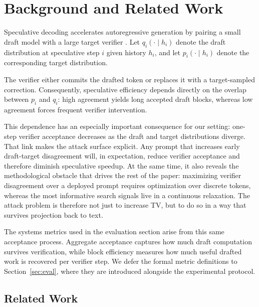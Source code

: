 \section{Background and Related Work}
\label{sec:background}

Speculative decoding accelerates autoregressive generation by pairing a small
draft model with a large target verifier \citep{leviathan2023speculative}. Let
$q_i(\cdot \mid h_i)$ denote the draft distribution at speculative step $i$
given history $h_i$, and let $p_i(\cdot \mid h_i)$ denote the corresponding
target distribution.

The verifier either commits the drafted token or replaces it with a
target-sampled correction. Consequently, speculative efficiency depends
directly on the overlap between $p_i$ and $q_i$: high agreement yields long
accepted draft blocks, whereas low agreement forces frequent verifier
intervention.

This dependence has an especially important consequence for our setting:
one-step verifier acceptance decreases as the draft and target distributions
diverge. That link makes the attack surface explicit. Any prompt that
increases early draft-target disagreement will, in expectation, reduce
verifier acceptance and therefore diminish speculative speedup. At the same
time, it also reveals the methodological obstacle that
drives the rest of the paper: maximizing verifier disagreement over a deployed
prompt requires optimization over discrete tokens, whereas the most informative
search signals live in a continuous relaxation. The attack problem is
therefore not just to increase TV, but to do so in a way that survives
projection back to text.

The systems metrics used in the evaluation section arise from this same
acceptance process. Aggregate acceptance captures how much draft computation
survives verification, while block efficiency measures how much useful drafted
work is recovered per verifier step. We defer the formal metric definitions to
Section~\ref{sec:eval}, where they are introduced alongside the experimental
protocol.

\subsection{Related Work}


